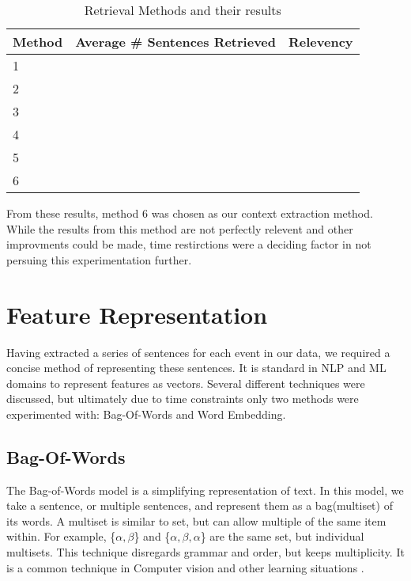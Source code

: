 \documentclass[bsc,frontabs,twoside,singlespacing,parskip,deptreport]{infthesis}     %
\begin{document}
\begin{table}[h]
\centering
\caption{Retrieval Methods and their results}
\label{table:retrieval}
\begin{tabular}{|l|l|l|}
  \hline
Method & Average \# Sentences Retrieved & Relevency \\
\hline
1      &                                &           \\
2      &                                &           \\
3      &                                &           \\
4      &                                &           \\
5      &                                &           \\
6      &                                &           \\        
\hline
\end{tabular}
\end{table}

From these results, method 6 was chosen as our context extraction method. While the
results from this method are not perfectly relevent and other improvments could be made,
time restirctions were a deciding factor in not persuing this experimentation further.

\section{Feature Representation}\label{sec:representation}
Having extracted a series of sentences for each event in our data, we required a concise method
of representing these sentences. It is standard in NLP and ML domains to represent features as vectors.
Several different techniques were discussed, but ultimately due to time constraints only two methods were
experimented with: Bag-Of-Words and Word Embedding.
\subsection{Bag-Of-Words}
The Bag-of-Words model is a simplifying representation of text.
In this model, we take a sentence, or multiple sentences, and represent them as a bag(multiset) of its words.
A multiset is similar to set, but can allow multiple of the same item within.
For example, \{$\alpha,\beta$\} and \{$\alpha,\beta,\alpha$\} are the same set, but individual multisets.
This technique disregards grammar and order, but keeps multiplicity. It is a common technique in Computer vision
and other learning situations \cite{}.
\end{document}
